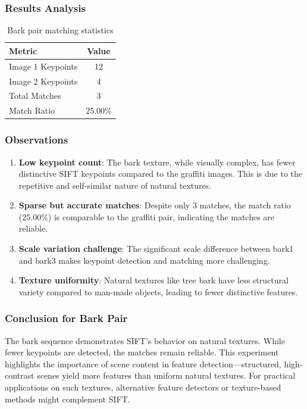 \documentclass[12pt,a4paper]{article}
\begin{document}
\subsubsection{Results Analysis}
\begin{table}[H]
\centering
\begin{tabular}{@{}lc@{}}
\toprule
\textbf{Metric} & \textbf{Value} \\
\midrule
Image 1 Keypoints & 12 \\
Image 2 Keypoints & 4 \\
Total Matches & 3 \\
Match Ratio & 25.00\% \\
\bottomrule
\end{tabular}
\caption{Bark pair matching statistics}
\end{table}

\subsubsection{Observations}
\begin{enumerate}
    \item \textbf{Low keypoint count}: The bark texture, while visually complex, has fewer distinctive SIFT keypoints compared to the graffiti images. This is due to the repetitive and self-similar nature of natural textures.
    
    \item \textbf{Sparse but accurate matches}: Despite only 3 matches, the match ratio (25.00\%) is comparable to the graffiti pair, indicating the matches are reliable.
    
    \item \textbf{Scale variation challenge}: The significant scale difference between bark1 and bark3 makes keypoint detection and matching more challenging.
    
    \item \textbf{Texture uniformity}: Natural textures like tree bark have less structural variety compared to man-made objects, leading to fewer distinctive features.
\end{enumerate}

\subsubsection{Conclusion for Bark Pair}
The bark sequence demonstrates SIFT's behavior on natural textures. While fewer keypoints are detected, the matches remain reliable. This experiment highlights the importance of scene content in feature detection—structured, high-contrast scenes yield more features than uniform natural textures. For practical applications on such textures, alternative feature detectors or texture-based methods might complement SIFT.
\end{document}
